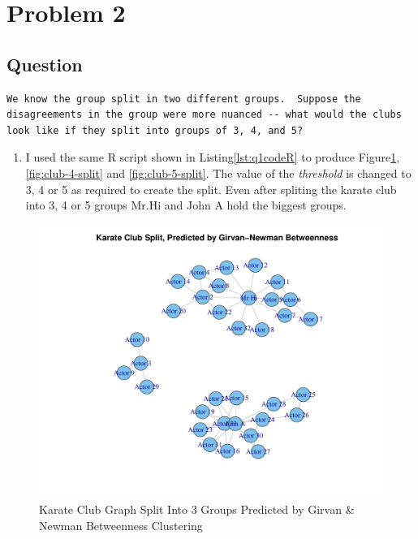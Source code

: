 \section{Problem 2}
\label{part2}
\subsection*{Question}
\begingroup
\begin{verbatim}
We know the group split in two different groups.  Suppose the
disagreements in the group were more nuanced -- what would the clubs
look like if they split into groups of 3, 4, and 5?
\end{verbatim}

\begin{enumerate}
\item I used the same R script shown in Listing\ref{lst:q1codeR} to produce Figure\ref{fig:club-3-split}, \ref{fig:club-4-split} and \ref{fig:club-5-split}. The value of the \emph{threshold} is changed to 3, 4 or 5 as required to create the split. Even after spliting the karate club into 3, 4 or 5 groups Mr.Hi and John A hold the biggest groups. 
\end{enumerate}

\begin{figure}[h]
\includegraphics[scale=0.6]{R/group-of-3.pdf}
\caption{Karate Club Graph Split Into 3 Groups Predicted by Girvan \& Newman Betweenness Clustering}
\label{fig:club-3-split}
\end{figure}


